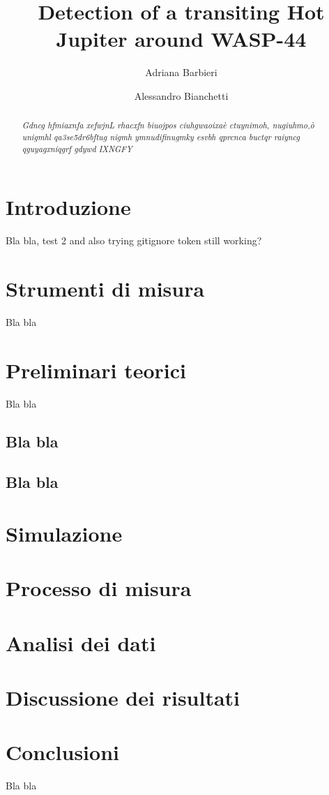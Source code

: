 \documentclass[a4paper,11pt,twocolumn]{article}
\title{Detection of a transiting Hot Jupiter around WASP-44}
\author{Adriana Barbieri \and Alessandro Bianchetti}
\begin{document}
\maketitle

\begin{abstract}

\emph{Gdncg hfmiaxnfa   xefwjnL rhacxfn  biuojpos  ciuhgwaoixaè ctuynimoh, nugiuhmo,ò  unigmhl qa3se5dr6bftug nigmh ymnudifinugmky esvbh qprcnca buctqr  raiyncg  qguyagxniqgrf gdywd IXNGFY}

\end{abstract}

\section{Introduzione}

Bla bla, test 2
and also trying gitignore
token still working?


\section{Strumenti di misura}

Bla bla



\section{Preliminari teorici}

Bla bla




\subsection{Bla bla}



\subsection{Bla bla}



\section{Simulazione}



\section{Processo di misura}






\section{Analisi dei dati}





\section{Discussione dei risultati}



\section{Conclusioni}

Bla bla
\end{document}
